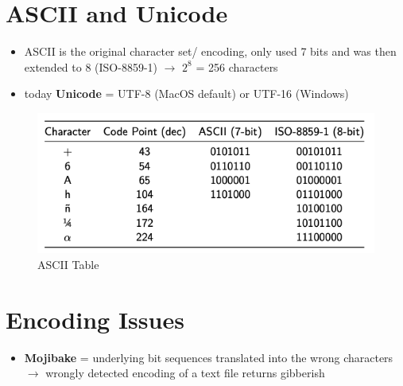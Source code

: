 \documentclass[]{article}
\begin{document}
\section{ASCII and Unicode}
\begin{itemize}
	\item ASCII is the original character set/ encoding, only used 7 bits  and was then extended to 8 (ISO-8859-1) $\rightarrow$ $2^8$ = 256 characters 
	\item today \textbf{Unicode} = UTF-8 (MacOS default) or UTF-16 (Windows)
\end{itemize}


\begin{figure}[H]
	\centering
	\includegraphics[width=0.7\linewidth]{week04/ASCII table}
	\caption{ASCII Table}
	\label{fig:ascii-table}
\end{figure}


\section{Encoding Issues}
\begin{itemize}
	\item \textbf{Mojibake} = underlying bit sequences translated into the wrong characters $\rightarrow$ wrongly detected encoding of a text file returns gibberish
\end{itemize}
	
	
\end{document}
